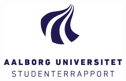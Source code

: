 \begin{center}
 






\includegraphics[height=4cm]{billeder/AAU-logo-stud-DK-RGB} %
 

\vfill %
\end{center}